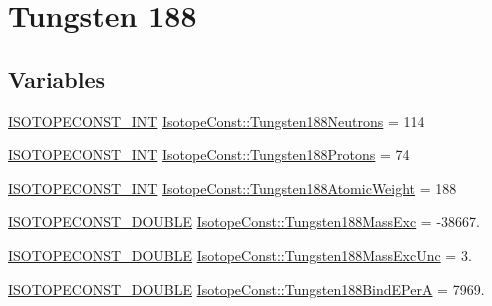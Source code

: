 \hypertarget{group___isotope_const-_tungsten-_w188}{}\section{Tungsten 188}
\label{group___isotope_const-_tungsten-_w188}
\subsection*{Variables}
\begin{DoxyCompactItemize}
\item 
\mbox{\hyperlink{group___isotope_const-_macros_ga5f18360b3e99483a35c32d789e62621c}{I\+S\+O\+T\+O\+P\+E\+C\+O\+N\+S\+T\+\_\+\+I\+NT}} \mbox{\hyperlink{group___isotope_const-_tungsten-_w188_ga77306ef55da9e589d0d244912899d8e9}{Isotope\+Const\+::\+Tungsten188\+Neutrons}} = 114
\item 
\mbox{\hyperlink{group___isotope_const-_macros_ga5f18360b3e99483a35c32d789e62621c}{I\+S\+O\+T\+O\+P\+E\+C\+O\+N\+S\+T\+\_\+\+I\+NT}} \mbox{\hyperlink{group___isotope_const-_tungsten-_w188_ga5f7c8d92fad0ed0a388af2ffe9a3fd68}{Isotope\+Const\+::\+Tungsten188\+Protons}} = 74
\item 
\mbox{\hyperlink{group___isotope_const-_macros_ga5f18360b3e99483a35c32d789e62621c}{I\+S\+O\+T\+O\+P\+E\+C\+O\+N\+S\+T\+\_\+\+I\+NT}} \mbox{\hyperlink{group___isotope_const-_tungsten-_w188_gad9aee5b904adbf5e6f58984f0db62963}{Isotope\+Const\+::\+Tungsten188\+Atomic\+Weight}} = 188
\item 
\mbox{\hyperlink{group___isotope_const-_macros_ga8f45a7272ce02c0b4c65c44636ed719a}{I\+S\+O\+T\+O\+P\+E\+C\+O\+N\+S\+T\+\_\+\+D\+O\+U\+B\+LE}} \mbox{\hyperlink{group___isotope_const-_tungsten-_w188_gafd20da016cd071a724fff9b652060a7f}{Isotope\+Const\+::\+Tungsten188\+Mass\+Exc}} = -\/38667.
\item 
\mbox{\hyperlink{group___isotope_const-_macros_ga8f45a7272ce02c0b4c65c44636ed719a}{I\+S\+O\+T\+O\+P\+E\+C\+O\+N\+S\+T\+\_\+\+D\+O\+U\+B\+LE}} \mbox{\hyperlink{group___isotope_const-_tungsten-_w188_gae5741fb7f55162d2642fb6271e6eba32}{Isotope\+Const\+::\+Tungsten188\+Mass\+Exc\+Unc}} = 3.
\item 
\mbox{\hyperlink{group___isotope_const-_macros_ga8f45a7272ce02c0b4c65c44636ed719a}{I\+S\+O\+T\+O\+P\+E\+C\+O\+N\+S\+T\+\_\+\+D\+O\+U\+B\+LE}} \mbox{\hyperlink{group___isotope_const-_tungsten-_w188_ga39833e032f020df93340565afbc0c6d1}{Isotope\+Const\+::\+Tungsten188\+Bind\+E\+PerA}} = 7969.
\item 

\end{DoxyCompactItemize}
